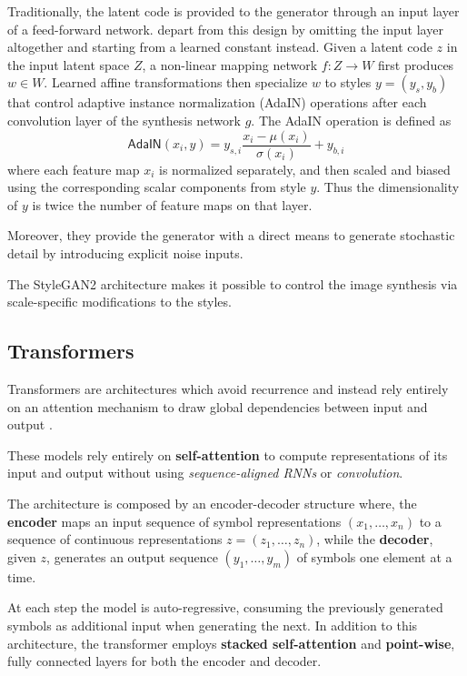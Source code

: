 \documentclass{article}
\begin{document}
	Traditionally, the latent code is provided to the generator through an input layer of a feed-forward 
	network. \citet{karras2020analyzing} depart from this design by omitting the input layer altogether 
	and starting from a learned constant instead. 
	Given a latent code $z$ in the input latent space $Z$, a non-linear mapping network $f : Z 
	\rightarrow W$ first produces $w \in W $.
	Learned affine transformations then specialize $w$ to styles $y = (y_s, y_b)$ that control adaptive 
	instance normalization (AdaIN) \cite{?} operations after each convolution layer of the synthesis 
	network $g$. The AdaIN operation is defined as
	\begin{equation}
		\label{e:adain}
		\mathsf{AdaIN}(x_i, y) = y_{s, i} \frac{x_i - \mu(x_i)}{\sigma (x_i)} + y_{b,i}
	\end{equation}
	where each feature map $x_i$ is normalized separately, and then scaled and biased using the 
	corresponding scalar components from style $y$. Thus the dimensionality of $y$ is twice the 
	number of feature maps on that layer.
	
	Moreover, they provide the generator with a direct means to generate stochastic detail by 
	introducing explicit noise inputs. 

	The StyleGAN2 architecture makes it possible to control the image synthesis via scale-specific 
	modifications to the styles. 
	
	\subsection{Transformers}%
	Transformers are architectures which avoid recurrence and instead rely entirely on an attention 
	mechanism to draw global dependencies between input and output	\cite{vaswani2017attention}.
	
	These models rely entirely on \textbf{self-attention} to compute representations of its input and 
	output without using \textit{sequence-aligned RNNs} or \textit{convolution}. 

	The architecture is composed by an encoder-decoder structure where, the \textbf{encoder} maps an 
	input sequence of symbol representations $(x_1,\dots, x_n)$ to a sequence of continuous 
	representations $z = (z_1, \dots, z_n)$, while the  \textbf{decoder}, given $z$, generates an 
	output sequence $(y_1, \dots, y_m)$ of symbols one element at a time. 
	
	At each step the model is auto-regressive, consuming the previously generated symbols as 
	additional input when generating the next.
	In addition to this architecture, the transformer employs \textbf{stacked self-attention} and 
	\textbf{point-wise}, fully connected layers for both the encoder and decoder.
	
\end{document}
